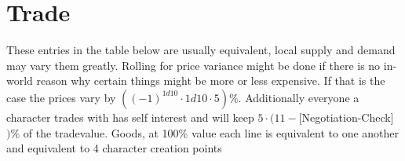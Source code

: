 

\chapter{Trade}\label{ch:trade}
These entries in the table below are usually equivalent, local supply and demand may vary them greatly.
Rolling for price variance might be done if there is no in-world reason why certain things might be more or
less expensive.
If that is the case the prices vary by \(((-1)^{1d10}\cdot1d10\cdot5) \%\).
Additionally everyone a character trades with has self interest and will keep \(5\cdot(11-\)[Negotiation-Check]\()\%\) of
the tradevalue.\vspace{1.5cm}
Goods, at 100\% value each line is equivalent to one another and equivalent to 4 character creation points \par
